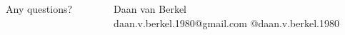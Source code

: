 \begin{frame}
	\begin{columns}
		\begin{column}{0.45\textwidth}
			Any questions?
		\end{column}
		\begin{column}{0.45\textwidth}
			Daan van Berkel\\
			daan.v.berkel.1980@gmail.com
			@daan.v.berkel.1980
		\end{column}
	\end{columns}
\end{frame}
